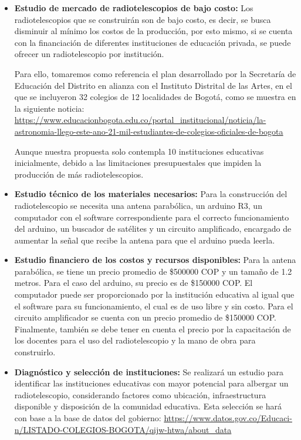 \begin{itemize}

\item \textbf{Estudio de mercado de radiotelescopios de bajo costo:} Los 
radiotelescopios que se construirán son de bajo costo, es decir, se busca 
disminuir al mínimo los costos de la producción, por esto mismo, si se cuenta 
con la financiación de diferentes instituciones de educación privada, se puede 
ofrecer un radiotelescopio por institución.

Para ello, tomaremos como referencia el plan desarrollado por la Secretaría de
Educación del Distrito en alianza con el Instituto Distrital de las Artes, en
el que se incluyeron 32 colegios de 12 localidades de Bogotá, como se muestra
en la siguiente noticia:
\url{https://www.educacionbogota.edu.co/portal_institucional/noticia/la-
astronomia-llego-este-ano-21-mil-estudiantes-de-colegios-oficiales-de-bogota}

Aunque nuestra propuesta solo contempla 10 instituciones educativas
inicialmente, debido a las limitaciones presupuestales que impiden la
producción de más radiotelescopios.

\item \textbf{Estudio técnico de los materiales necesarios:} Para la 
construcción del radiotelescopio se necesita una antena parabólica, un arduino 
R3, un computador con el software correspondiente para el correcto 
funcionamiento del arduino, un buscador de satélites y un circuito amplificado, 
encargado de aumentar la señal que recibe la antena para que el arduino pueda 
leerla.

\item \textbf{Estudio financiero de los costos y recursos disponibles:} Para la 
antena parabólica, se tiene un precio promedio de \$500000 COP y un tamaño de 
1.2 metros. Para el caso del arduino, su precio es de \$150000 COP. El 
computador puede ser proporcionado por la institución educativa al igual que el 
software para su funcionamiento, el cual es de uso libre y sin costo. Para el 
circuito amplificador se cuenta con un precio promedio de \$150000 COP. 
Finalmente, también se debe tener en cuenta el precio por la capacitación de 
los docentes para el uso del radiotelescopio y la mano de obra para construirlo.

\item \textbf{Diagnóstico y selección de instituciones:} Se realizará un estudio
para identificar las instituciones educativas con mayor potencial para albergar
un radiotelescopio, considerando factores como ubicación, infraestructura
disponible y disposición de la comunidad educativa. Esta selección se hará con
base a la base de datos del gobierno:
\url{https://www.datos.gov.co/Educaci-n/LISTADO-COLEGIOS-BOGOTA/qijw-htwa/about_data}


\end{itemize}
